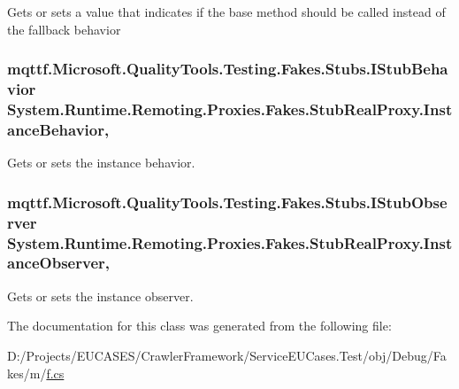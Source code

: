 Gets or sets a value that indicates if the base method should be called instead of the fallback behavior

\hypertarget{class_system_1_1_runtime_1_1_remoting_1_1_proxies_1_1_fakes_1_1_stub_real_proxy_a981195d68d9d961ad27b35b4be1dc9b0}{
\subsubsection[{Instance\-Behavior}]{\setlength{\rightskip}{0pt plus 5cm}mqttf.\-Microsoft.\-Quality\-Tools.\-Testing.\-Fakes.\-Stubs.\-I\-Stub\-Behavior System.\-Runtime.\-Remoting.\-Proxies.\-Fakes.\-Stub\-Real\-Proxy.\-Instance\-Behavior\hspace{0.3cm}{\ttfamily [get]}, {\ttfamily [set]}}}\label{class_system_1_1_runtime_1_1_remoting_1_1_proxies_1_1_fakes_1_1_stub_real_proxy_a981195d68d9d961ad27b35b4be1dc9b0}


Gets or sets the instance behavior.

\hypertarget{class_system_1_1_runtime_1_1_remoting_1_1_proxies_1_1_fakes_1_1_stub_real_proxy_a68360bd9e8874d1e8a47c1e48522244d}{
\subsubsection[{Instance\-Observer}]{\setlength{\rightskip}{0pt plus 5cm}mqttf.\-Microsoft.\-Quality\-Tools.\-Testing.\-Fakes.\-Stubs.\-I\-Stub\-Observer System.\-Runtime.\-Remoting.\-Proxies.\-Fakes.\-Stub\-Real\-Proxy.\-Instance\-Observer\hspace{0.3cm}{\ttfamily [get]}, {\ttfamily [set]}}}\label{class_system_1_1_runtime_1_1_remoting_1_1_proxies_1_1_fakes_1_1_stub_real_proxy_a68360bd9e8874d1e8a47c1e48522244d}


Gets or sets the instance observer.



The documentation for this class was generated from the following file\-:\begin{DoxyCompactItemize}
\item 
D\-:/\-Projects/\-E\-U\-C\-A\-S\-E\-S/\-Crawler\-Framework/\-Service\-E\-U\-Cases.\-Test/obj/\-Debug/\-Fakes/m/\hyperlink{m_2f_8cs}{f.\-cs}\end{DoxyCompactItemize}
